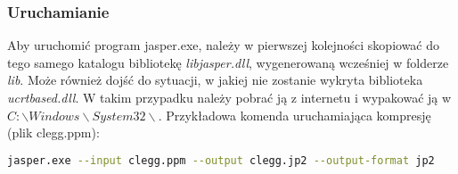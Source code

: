 \subsubsection{Uruchamianie}

Aby uruchomić program jasper.exe, należy w pierwszej kolejności skopiować do tego samego katalogu bibliotekę \textit{libjasper.dll}, wygenerowaną wcześniej w folderze \textit{lib}. Może również dojść do sytuacji, w jakiej nie zostanie wykryta biblioteka \textit{ucrtbased.dll}. W takim przypadku należy pobrać ją z internetu i wypakować ją w \textit{$C:\backslash Windows\backslash System32\backslash$}. Przykładowa komenda uruchamiająca kompresję (plik clegg.ppm):

\begin{lstlisting}[language=bash]
jasper.exe --input clegg.ppm --output clegg.jp2 --output-format jp2
\end{lstlisting}